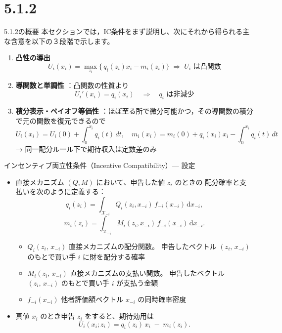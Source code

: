 \documentclass[dvipdfmx,autodetect-engine]{beamer}
\begin{document}
\section{5.1.2}

\begin{frame}{5.1.2の概要}
  \small
  本セクションでは，IC条件をまず説明し、次にそれから得られる主な含意を以下の３段階で示します。
  \vspace{1ex}
  \begin{enumerate}
    \item \textbf{凸性の導出}  
      \[
        U_i(x_i)
        =\max_{z_i}\{\,q_i(z_i)x_i - m_i(z_i)\}
        \;\Rightarrow\;
        U_i \text{ は凸関数}
      \]
    \item \textbf{導関数と単調性}  
      ：凸関数の性質より
      \[
        U_i'(x_i)=q_i(x_i)
        \quad\Longrightarrow\quad
        q_i \text{ は非減少}
      \]
    \item \textbf{積分表示・ペイオフ等価性}  
      ：ほぼ至る所で微分可能かつ，その導関数の積分で元の関数を復元できるので
      \[
        U_i(x_i)=U_i(0)+\int_{0}^{x_i}q_i(t)\,dt,\quad
        m_i(x_i)=m_i(0)+q_i(x_i)x_i-\int_{0}^{x_i}q_i(t)\,dt
      \]
      → 同一配分ルール下で期待収入は定数差のみ
  \end{enumerate}
\end{frame}


\begin{frame}{インセンティブ両立性条件（Incentive Compatibility）— 設定}
  \begin{itemize}
    \item 直接メカニズム $(Q,M)$ において、申告した値 $z_i$ のときの
    配分確率と支払いを次のように定義する：  
    \begin{equation}\tag{5.1}
      q_i(z_i)
      = \int_{\mathcal{X}_{-i}} Q_i(z_i,x_{-i})\,f_{-i}(x_{-i})\,\mathrm{d}x_{-i},
    \end{equation}
    \begin{equation}\tag{5.2}
      m_i(z_i)
      = \int_{\mathcal{X}_{-i}} M_i(z_i,x_{-i})\,f_{-i}(x_{-i})\,\mathrm{d}x_{-i}.
    \end{equation}
    \small
    \begin{itemize}
      \item $Q_i(z_i,\,x_{-i})$  
        直接メカニズムの配分関数。  
        申告したベクトル $(z_i,\,x_{-i})$ のもとで買い手 $i$ に財を配分する確率
      \item $M_i(z_i,\,x_{-i})$  
        直接メカニズムの支払い関数。  
        申告したベクトル $(z_i,\,x_{-i})$ のもとで買い手 $i$ が支払う金額
      \item $f_{-i}(x_{-i})$  
        他者評価額ベクトル $x_{-i}$ の同時確率密度
    \end{itemize}
    \item 真値 $x_i$ のとき申告 $z_i$ をすると、期待効用は
    \begin{equation}\tag{5.3}
      U_i(x_i;z_i)
      = q_i(z_i)\,x_i \;-\; m_i(z_i).
    \end{equation}
  \end{itemize}
\end{frame}
\end{document}
